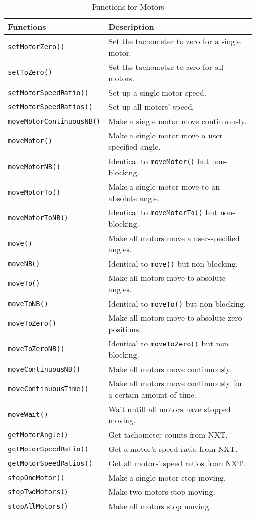 \begin{longtable}{p{6cm}p{10cm}}
\caption{Functions for Motors}\\
\hline
Functions & Description\\
\hline
{\tt setMotorZero()}         &Set the tachometer to zero for a single motor.\\
{\tt setToZero()}            &Set the tachometer to zero for all motors.\\
{\tt setMotorSpeedRatio()}   &Set up a single motor speed.\\
{\tt setMotorSpeedRatios()}  &Set up all motors' speed.\\
{\tt moveMotorContinuousNB()}&Make a single motor move continuously.\\
{\tt moveMotor()}            &Make a single motor move a user-specified angle.\\
{\tt moveMotorNB()}          &Identical to {\tt moveMotor()} but non-blocking.\\
{\tt moveMotorTo()}          &Make a single motor move to an absolute angle.\\
{\tt moveMotorToNB()}        &Identical to {\tt moveMotorTo()} but non-blocking.\\
{\tt move()}                 &Make all motors move a user-specified angles.\\
{\tt moveNB()}               &Identical to {\tt move()} but non-blocking.\\
{\tt moveTo()}               &Make all motors move to absolute angles.\\
{\tt moveToNB()}             &Identical to {\tt moveTo()} but non-blocking.\\
{\tt moveToZero()}           &Make all motors move to absolute zero positions.\\
{\tt moveToZeroNB()}         &Identical to {\tt moveToZero()} but non-blocking.\\
{\tt moveContinuousNB()}     &Make all motors move continuously.\\
{\tt moveContinuousTime()}   &Make all motors move continuously for a certain amount of time.\\
{\tt moveWait()}             &Wait untill all motors have stopped moving.\\
{\tt getMotorAngle()}        &Get tachometer counts from NXT.\\
{\tt getMotorSpeedRatio()}   &Get a motor's speed ratio from NXT.\\
{\tt getMotorSpeedRatios()}  &Get all motors' speed ratios from NXT.\\
{\tt stopOneMotor()}         &Make a single motor stop moving.\\
{\tt stopTwoMotors()}        &Make two motors stop moving.\\
{\tt stopAllMotors()}        &Make all motors stop moving.\\
\hline
\end{longtable}

